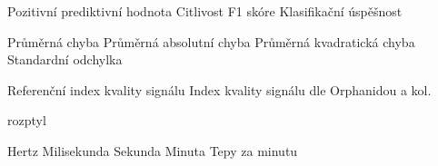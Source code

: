 \begin{acronym}[KolikMista]
			{Pozitivní prediktivní hodnota}
			{Citlivost}
			{F1 skóre}
			{Klasifikační úspěšnost}

			{Průměrná chyba}
			{Průměrná absolutní chyba}
			{Průměrná kvadratická chyba}
			{Standardní odchylka}

		{Referenční index kvality signálu}
		{Index kvality signálu dle Orphanidou a kol.}

			{rozptyl}

			{Hertz}
			{Milisekunda}
			{Sekunda}
			{Minuta}
			{Tepy za minutu}


\end{acronym}
